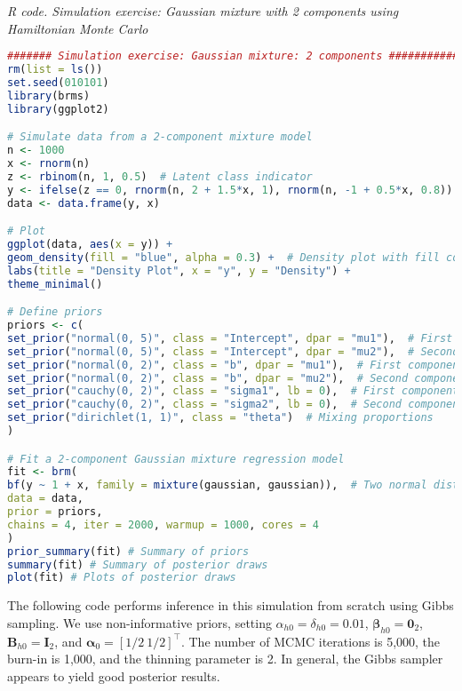 \begin{tcolorbox}[enhanced,width=4.67in,center upper,
	fontupper=\large\bfseries,drop shadow southwest,sharp corners]
	\textit{R code. Simulation exercise: Gaussian mixture with 2 components using Hamiltonian Monte Carlo}
	\begin{VF}
		\begin{lstlisting}[language=R]
####### Simulation exercise: Gaussian mixture: 2 components #############
rm(list = ls())
set.seed(010101)
library(brms)
library(ggplot2)

# Simulate data from a 2-component mixture model
n <- 1000
x <- rnorm(n)
z <- rbinom(n, 1, 0.5)  # Latent class indicator
y <- ifelse(z == 0, rnorm(n, 2 + 1.5*x, 1), rnorm(n, -1 + 0.5*x, 0.8))
data <- data.frame(y, x)

# Plot
ggplot(data, aes(x = y)) +
geom_density(fill = "blue", alpha = 0.3) +  # Density plot with fill color
labs(title = "Density Plot", x = "y", y = "Density") +
theme_minimal()

# Define priors
priors <- c(
set_prior("normal(0, 5)", class = "Intercept", dpar = "mu1"),  # First component intercept
set_prior("normal(0, 5)", class = "Intercept", dpar = "mu2"),  # Second component intercept
set_prior("normal(0, 2)", class = "b", dpar = "mu1"),  # First component slope
set_prior("normal(0, 2)", class = "b", dpar = "mu2"),  # Second component slope
set_prior("cauchy(0, 2)", class = "sigma1", lb = 0),  # First component sigma
set_prior("cauchy(0, 2)", class = "sigma2", lb = 0),  # Second component sigma
set_prior("dirichlet(1, 1)", class = "theta")  # Mixing proportions
)

# Fit a 2-component Gaussian mixture regression model
fit <- brm(
bf(y ~ 1 + x, family = mixture(gaussian, gaussian)),  # Two normal distributions
data = data,
prior = priors,
chains = 4, iter = 2000, warmup = 1000, cores = 4
)
prior_summary(fit) # Summary of priors
summary(fit) # Summary of posterior draws
plot(fit) # Plots of posterior draws
		\end{lstlisting}
	\end{VF}
\end{tcolorbox}

The following code performs inference in this simulation from scratch using Gibbs sampling. We use non-informative priors, setting $\alpha_{h0}=\delta_{h0}=0.01$, $\bm{\beta}_{h0}=\bm{0}_2$, $\bm{B}_{h0}=\bm{I}_2$, and $\bm{\alpha}_0=[1/2 \ 1/2]^{\top}$. The number of MCMC iterations is 5,000, the burn-in is 1,000, and the thinning parameter is 2. In general, the Gibbs sampler appears to yield good posterior results.

